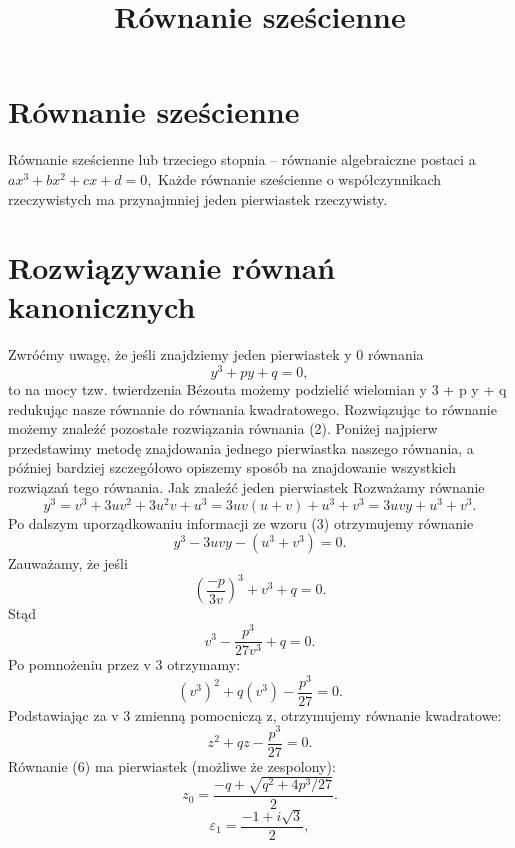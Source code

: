 \documentclass{article}
\begin{document}
\title{Równanie sześcienne}
\maketitle

\section{Równanie sześcienne}
Równanie sześcienne lub trzeciego stopnia – równanie algebraiczne postaci a $ax^3+bx^2+cx+d=0,$ Każde równanie sześcienne o współczynnikach rzeczywistych ma przynajmniej jeden pierwiastek rzeczywisty. 
\section{Rozwiązywanie równań kanonicznych}
Zwróćmy uwagę, że jeśli znajdziemy jeden pierwiastek y 0 równania 
$${ y^{3}+py+q=0,}$$
to na mocy tzw. twierdzenia Bézouta możemy podzielić wielomian y 3 + p y + q  redukując nasze równanie do równania kwadratowego. Rozwiązując to równanie możemy znaleźć pozostałe rozwiązania równania (2). Poniżej najpierw przedstawimy metodę znajdowania jednego pierwiastka naszego równania, a później bardziej szczegółowo opiszemy sposób na znajdowanie wszystkich rozwiązań tego równania. 
Jak znaleźć jeden pierwiastek
Rozważamy równanie 
$${ y^{3}=v^{3}+3uv^{2}+3u^{2}v+u^{3}=3uv(u+v)+u^{3}+v^{3}=3uvy+u^{3}+v^{3}.}$$
Po dalszym uporządkowaniu informacji ze wzoru (3) otrzymujemy równanie 
$${ y^{3}-3uvy-(u^{3}+v^{3})=0.}$$
Zauważamy, że jeśli 
$${ \left({\frac {-p}{3v}}\right)^{3}+v^{3}+q=0.}$$
Stąd
$${ v^{3}-{\frac {p^{3}}{27v^{3}}}+q=0.}$$
Po pomnożeniu przez v 3 otrzymamy:
$${ (v^{3})^{2}+q(v^{3})-{\frac {p^{3}}{27}}=0.}$$
Podstawiając za v 3 zmienną pomocniczą  z, otrzymujemy równanie kwadratowe:
$${ z^{2}+qz-{\frac {p^{3}}{27}}=0.}$$
Równanie (6) ma pierwiastek (możliwe że zespolony): 
$$z_0=\frac{-q+\sqrt{q^2+4p^3/27}}{2}.$$
$$\varepsilon_1=\frac{-1 + i\sqrt 3}{2},$$
\end{document}
